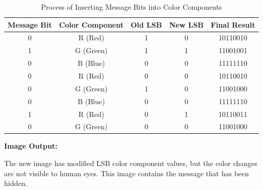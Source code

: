 \documentclass{ittelkom}
\begin{document}
\begin{enumerate}
\begin{enumerate}
                    \begin{table}[H]
                        \centering
                        \begin{tabular}{|c|c|c|c|c|}
                            \hline
                            \textbf{Message Bit} & \textbf{Color Component} & \textbf{Old LSB} & \textbf{New LSB} & \textbf{Final Result} \\ \hline
                            0                    & R (Red)                  & 1                & 0                & 10110010              \\ \hline
                            1                    & G (Green)                & 1                & 1                & 11001001              \\ \hline
                            0                    & B (Blue)                 & 0                & 0                & 11111110              \\ \hline
                            0                    & R (Red)                  & 0                & 0                & 10110010              \\ \hline
                            0                    & G (Green)                & 1                & 0                & 11001000              \\ \hline
                            0                    & B (Blue)                 & 0                & 0                & 11111110              \\ \hline
                            1                    & R (Red)                  & 0                & 1                & 10110011              \\ \hline
                            0                    & G (Green)                & 0                & 0                & 11001000              \\ \hline
                        \end{tabular}
                        \caption{Process of Inserting Message Bits into Color Components}
                    \end{table}

                    \textbf{Image Output:}

                    The new image has modified LSB color component values, but the color changes
                    are not visible to human eyes. This image contains the message that has been
                    hidden.

          \end{enumerate}


\end{enumerate}
\end{document}
